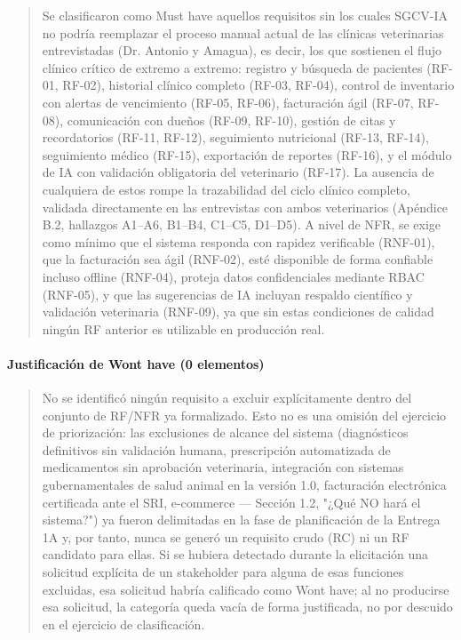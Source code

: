 \documentclass[
]{article}
\begin{document}
\begin{quote}
Se clasificaron como Must have aquellos requisitos sin los cuales
SGCV-IA no podría reemplazar el proceso manual actual de las clínicas
veterinarias entrevistadas (Dr. Antonio y Amagua), es decir, los que
sostienen el flujo clínico crítico de extremo a extremo: registro y
búsqueda de pacientes (RF-01, RF-02), historial clínico completo (RF-03,
RF-04), control de inventario con alertas de vencimiento (RF-05, RF-06),
facturación ágil (RF-07, RF-08), comunicación con dueños (RF-09, RF-10),
gestión de citas y recordatorios (RF-11, RF-12), seguimiento nutricional
(RF-13, RF-14), seguimiento médico (RF-15), exportación de reportes
(RF-16), y el módulo de IA con validación obligatoria del veterinario
(RF-17). La ausencia de cualquiera de estos rompe la trazabilidad del
ciclo clínico completo, validada directamente en las entrevistas con
ambos veterinarios (Apéndice B.2, hallazgos A1--A6, B1--B4, C1--C5,
D1--D5). A nivel de NFR, se exige como mínimo que el sistema responda
con rapidez verificable (RNF-01), que la facturación sea ágil (RNF-02),
esté disponible de forma confiable incluso offline (RNF-04), proteja
datos confidenciales mediante RBAC (RNF-05), y que las sugerencias de IA
incluyan respaldo científico y validación veterinaria (RNF-09), ya que
sin estas condiciones de calidad ningún RF anterior es utilizable en
producción real.
\end{quote}

\paragraph{Justificación de Won\textquotesingle t have (0
elementos)}\label{justificaciuxf3n-de-wont-have-0-elementos}

\begin{quote}
No se identificó ningún requisito a excluir explícitamente dentro del
conjunto de RF/NFR ya formalizado. Esto no es una omisión del ejercicio
de priorización: las exclusiones de alcance del sistema (diagnósticos
definitivos sin validación humana, prescripción automatizada de
medicamentos sin aprobación veterinaria, integración con sistemas
gubernamentales de salud animal en la versión 1.0, facturación
electrónica certificada ante el SRI, e-commerce --- Sección 1.2, "¿Qué
NO hará el sistema?") ya fueron delimitadas en la fase de planificación
de la Entrega 1A y, por tanto, nunca se generó un requisito crudo (RC)
ni un RF candidato para ellas. Si se hubiera detectado durante la
elicitación una solicitud explícita de un stakeholder para alguna de
esas funciones excluidas, esa solicitud habría calificado como
Won\textquotesingle t have; al no producirse esa solicitud, la categoría
queda vacía de forma justificada, no por descuido en el ejercicio de
clasificación.
\end{quote}
\end{document}
